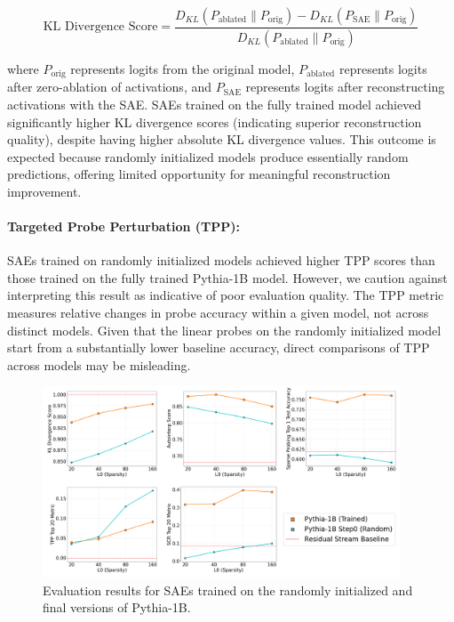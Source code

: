 \documentclass{article}
\theoremstyle{plain}
\theoremstyle{definition}
\theoremstyle{remark}
\begin{document}
\[
\text{KL Divergence Score} = \frac{D_{KL}(P_{\text{ablated}} \parallel P_{\text{orig}}) - D_{KL}(P_{\text{SAE}} \parallel P_{\text{orig}})}{D_{KL}(P_{\text{ablated}} \parallel P_{\text{orig}})}
\]

where \(P_{\text{orig}}\) represents logits from the original model, \(P_{\text{ablated}}\) represents logits after zero-ablation of activations, and \(P_{\text{SAE}}\) represents logits after reconstructing activations with the SAE. SAEs trained on the fully trained model achieved significantly higher KL divergence scores (indicating superior reconstruction quality), despite having higher absolute KL divergence values. This outcome is expected because randomly initialized models produce essentially random predictions, offering limited opportunity for meaningful reconstruction improvement.

\paragraph{Targeted Probe Perturbation (TPP):} SAEs trained on randomly initialized models achieved higher TPP scores than those trained on the fully trained Pythia-1B model. However, we caution against interpreting this result as indicative of poor evaluation quality. The TPP metric measures relative changes in probe accuracy within a given model, not across distinct models. Given that the linear probes on the randomly initialized model start from a substantially lower baseline accuracy, direct comparisons of TPP across models may be misleading.


\begin{figure}[htb]
\centering
\includegraphics[width=0.95\textwidth]
{images/Pythia-1b-random.png}
\caption{Evaluation results for SAEs trained on the randomly initialized and final versions of Pythia-1B.}
\label{fig:random_model_evals}
\end{figure}
\end{document}
